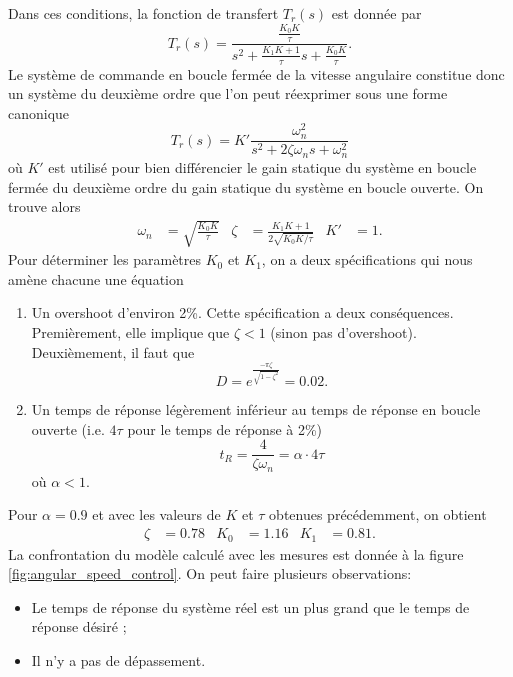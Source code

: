 \documentclass[frenchb, paper=a4, fontsize=11pt]{scrartcl}
\numberwithin{equation}{section}					%
\numberwithin{figure}{section}					%
\numberwithin{table}{section}						%
\begin{document}
Dans ces conditions, la fonction de transfert $T_r(s)$ est donnée
par
\begin{equation}
	T_r(s) = \frac{\frac{K_0K}{\tau}}{s^2 +\frac{K_1K+1}{\tau}s + \frac{K_0K}{\tau}}.
\end{equation}
Le système de commande en boucle fermée de la vitesse angulaire
constitue donc un système du deuxième ordre que l'on peut réexprimer
sous une forme canonique
\begin{equation}
	T_r(s) = K'\frac{\omega_n^2}{s^2 + 2\zeta\omega_n s+ \omega_n^2}
\end{equation}
où $K'$ est utilisé pour bien différencier le gain statique du système en
boucle fermée du deuxième ordre du gain statique du système en boucle
ouverte. On trouve alors
\begin{align}
	\omega_n & = \sqrt{\frac{K_0K}{\tau}} & \zeta & = \frac{K_1K + 1}{2\sqrt{K_0K/\tau}}
	& K' & = 1.
\end{align}
Pour déterminer les paramètres $K_0$ et $K_1$, on a deux spécifications
qui nous amène chacune une équation
\begin{enumerate}
	\item Un overshoot d'environ 2\%. Cette spécification a deux conséquences.
	Premièrement, elle implique que $\zeta < 1$ (sinon pas d'overshoot). Deuxièmement,
	il faut que
	\begin{equation}
		D = e^{\frac{-\pi\zeta}{\sqrt{1-\zeta^2}}} = 0.02.
	\end{equation}
	\item Un temps de réponse légèrement inférieur au temps de réponse en boucle
	ouverte (i.e. $4\tau$ pour le temps de réponse à 2\%)
	\begin{equation}
		t_R = \frac{4}{\zeta\omega_n} = \alpha \cdot 4\tau
	\end{equation}
	où $\alpha < 1$.
\end{enumerate}
Pour $\alpha = 0.9$ et avec les valeurs de $K$ et $\tau$ obtenues précédemment,
on obtient
\begin{align}
	\zeta & = 0.78 & K_0 & = 1.16 & K_1 & = 0.81.
\end{align}
La confrontation du modèle calculé avec les mesures est donnée à la
figure \ref{fig:angular_speed_control}. On peut faire plusieurs
observations:
\begin{itemize}
	\item Le temps de réponse du système réel est un plus grand que le temps
	de réponse désiré ;
	\item Il n'y a pas de dépassement.
\end{itemize}
\end{document}

